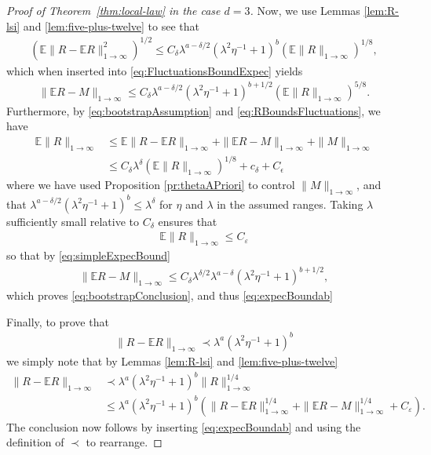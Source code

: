 \documentclass[11pt]{amsart}
\def\Expec{{\mathbb E}}
\def\eps{{\varepsilon}}
\newcommand{\ldom}{\prec}
\numberwithin{equation}{section}
\numberwithin{theorem}{section}
\begin{document}
\begin{proof}[Proof of Theorem~\ref{thm:local-law} in the case $d=3$]
Now, we use Lemmas \ref{lem:R-lsi} and \ref{lem:five-plus-twelve} to see that
\begin{align}
\label{eq:RBoundsFluctuations}
(\Expec \|R-\Expec R\|_{1\to \infty}^{2})^{1 /2}\leq C_\delta
\lambda^{a-\delta /2}(\lambda^{2}\eta^{-1}+1)^{b}(\Expec\|R\|_{1\to \infty})^{1 /8},
\end{align}
which when inserted into \eqref{eq:FluctuationsBoundExpec} yields
\begin{align}
\label{eq:simpleExpecBound}
\|\Expec R-M \|_{1\to \infty}\leq C_\delta \lambda^{a-\delta /2}(\lambda^{2}\eta^{-1}+1)^{b+1 /2}(\Expec \|R\|_{1\to \infty})^{5/8}.
\end{align}
Furthermore, by \eqref{eq:bootstrapAssumption} and \eqref{eq:RBoundsFluctuations}, we have
\begin{align*}
\Expec \|R\|_{1\to \infty}
&\leq \Expec \|R-\Expec R\|_{1\to \infty} +\|\Expec R-M\|_{1\to \infty}+\|M\|_{1\to\infty}\\
&\leq C_{\delta}\lambda^{\delta}(\Expec\|R\|_{1\to \infty})^{1 /8} + c_{\delta} + C_{\epsilon}
\end{align*}
where we have used Proposition \ref{pr:thetaAPriori} to control $\|M\|_{1\to \infty}$, and that
$\lambda^{a-\delta /2}(\lambda^{2}\eta^{-1}+1)^{b}\leq \lambda^{\delta}$ for $\eta$ and $\lambda$ in the
assumed ranges.
Taking $\lambda$ sufficiently small relative to $C_\delta$ ensures that
\begin{align*}
\Expec \|R\|_{1\to \infty} \leq  C_\eps
\end{align*}
so that by \eqref{eq:simpleExpecBound}
\begin{align*}
\|\Expec R - M\|_{1\to \infty} \leq C_\delta \lambda^{\delta / 2} \lambda^{a-\delta }(\lambda^{2}\eta^{-1}+1)^{b+1 /2},
\end{align*}
which proves \eqref{eq:bootstrapConclusion}, and thus \eqref{eq:expecBoundab}

Finally, to prove that
\begin{align*}
\|R-\Expec R\|_{1\to \infty}\ldom \lambda^{a}(\lambda^2\eta^{-1}+1)^{b}
\end{align*}
we simply note that by Lemmas
\ref{lem:R-lsi} and \ref{lem:five-plus-twelve}
\begin{align*}
\|R-\Expec R\|_{1\to \infty}&\ldom \lambda^{a}(\lambda^{2}\eta^{-1}+1)^{b}\|R\|_{1\to \infty}^{1 /4}\\
&\leq \lambda^{a}(\lambda^{2}\eta^{-1}+1)^{b}
\left(\|R-\Expec R\|_{1\to \infty}^{1 /4}+\|\Expec R-M\|_{1\to \infty}^{1 /4}+C_\eps \right).
\end{align*}
The conclusion now follows by inserting \eqref{eq:expecBoundab} and using the definition of $\ldom$ to rearrange.
\end{proof}
\end{document}
